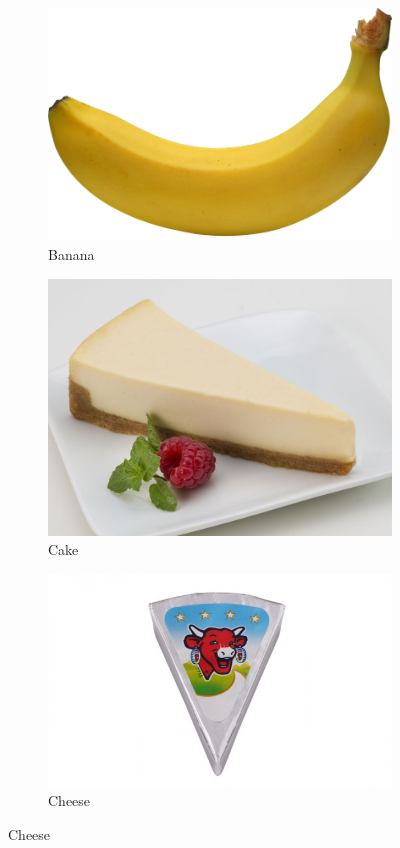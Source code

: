 \documentclass[a4paper,doc,natbib]{apa6}
\begin{document}
    \begin{figure}[h!]
        \begin{subfigure}[b]{0.32\textwidth}
            \caption{Banana}
            \includegraphics[width=0.95\linewidth]{Images/banana.png}
        \end{subfigure}
        \begin{subfigure}[b]{0.32\textwidth}
            \caption{Cake}
            \includegraphics[width=0.95\linewidth]{Images/cake.jpg}
        \end{subfigure}
        \begin{subfigure}[b]{0.32\textwidth}
            \caption{Cheese}
            \includegraphics[width=0.95\linewidth]{Images/cheese.jpg}

\end{subfigure}
\end{figure}
\end{document}
